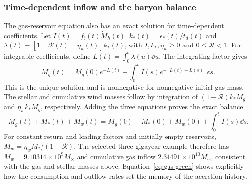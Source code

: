 \subsubsection{Time-dependent inflow and the baryon balance}
The gas-reservoir equation also has an exact solution for time-dependent coefficients. Let $I(t)=f_b(t)\dot M_h(t)$, $k_*(t)=\epsilon_*(t)/t_d(t)$ and $\lambda(t)=[1-\mathcal R(t)+\eta_w(t)]k_*(t)$, with $I,k_*,\eta_w\geq0$ and $0\leq\mathcal R<1$. For integrable coefficients, define $L(t)=\int_0^t\lambda(u)\dd u$. The integrating factor gives
\begin{equation}\label{eq:gas-green}
M_g(t)=M_g(0)e^{-L(t)}+\int_0^t I(s)e^{-[L(t)-L(s)]}\dd s.
\end{equation}
This is the unique solution and is nonnegative for nonnegative initial gas mass. The stellar and cumulative wind masses follow by integration of $(1-\mathcal R)k_*M_g$ and $\eta_wk_*M_g$, respectively. Adding the three equations proves the exact balance
\begin{equation}\label{eq:gas-balance}
M_g(t)+M_*(t)+M_w(t)
=M_g(0)+M_*(0)+M_w(0)+\int_0^t I(s)\dd s.
\end{equation}
For constant return and loading factors and initially empty reservoirs, $M_w=\eta_wM_* /(1-\mathcal R)$. The selected three-gigayear example therefore has $M_w=9.10314\times10^9M_\odot$ and cumulative gas inflow $2.34491\times10^{10}M_\odot$, consistent with the gas and stellar masses above. Equation~\eqref{eq:gas-green} shows explicitly how the consumption and outflow rates set the memory of the accretion history.
